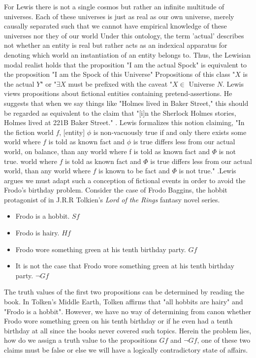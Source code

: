  For Lewis there is not a single cosmos but rather an infinite multitude of universes. Each of these universes is just as real as our own universe, merely causally separated such that we cannot have empirical knowledge of these universes nor they of our world\cite{lewis1986on} Under this ontology, the term 'actual' describes not whether an entity is real but rather acts as an indexical apparatus for denoting which world an instantiation of an entity belongs to. Thus, the Lewisian modal realist holds that the proposition "I am the actual Spock" is equivalent to the proposition "I am the Spock of this Universe" Propositions of this class "$X$ is the actual $Y$" or "$\exists X$ must be prefixed with the caveat "$X\in$ Universe $N$.
 Lewis views propositions about fictional entities containing pretend-assertions.\cite{Lewis1978-LEWTIF} He suggests
 that when we say things like "Holmes lived in Baker Street," this should be regarded as
 equivalent to the claim that "[i]n the Sherlock Holmes stories, Holmes lived at 221B Baker Street." \cite{Lewis1978-LEWTIF}. Lewis formalizes this notion claiming, "In the fiction world $f$, [entity] $\phi$ is non-vacuously true if and only there exists some 
 world where $f$ is told as known fact and $\phi$ is true differs less from our actual world, on
 balance, than any world where f is told as known fact and $\Phi$ is not true.
 world where $f$ is told as known fact and $\Phi$ is true differs less from our actual world, than any world where $f$ is known to be fact and $\Phi$ is not true." \cite{Lewis}.Lewis argues we must adapt such a conception of fictional events in order to avoid the Frodo's birthday problem. \cite{Lewis1978-LEWTIF} Consider the case of Frodo Baggins, the hobbit protagonist of in J.R.R Tolkien's \textit{Lord of the Rings} fantasy novel series. \begin{itemize}
 	\item Frodo is a hobbit. $Sf$
 	\item Frodo is hairy. $Hf$
 	\item Frodo wore something green at his tenth birthday party. $Gf$
 	\item  It is not the case that Frodo wore something green at his tenth birthday party. $\neg Gf$
 \end{itemize}
 The truth values of the first two propositions can be determined by reading the book. In Tolken's Middle Earth, Tolken affirms that "all hobbits are hairy" and "Frodo is a hobbit". However, we have no way of determining from canon whether Frodo wore something green on his tenth birthday or if he even had a tenth birthday at all since the books never covered such topics. Herein the problem lies, how do we assign a truth value to the propositions $Gf$ and $\neg Gf$, one of these two claims must be false or else we will have a logically contradictory state of affairs. 
